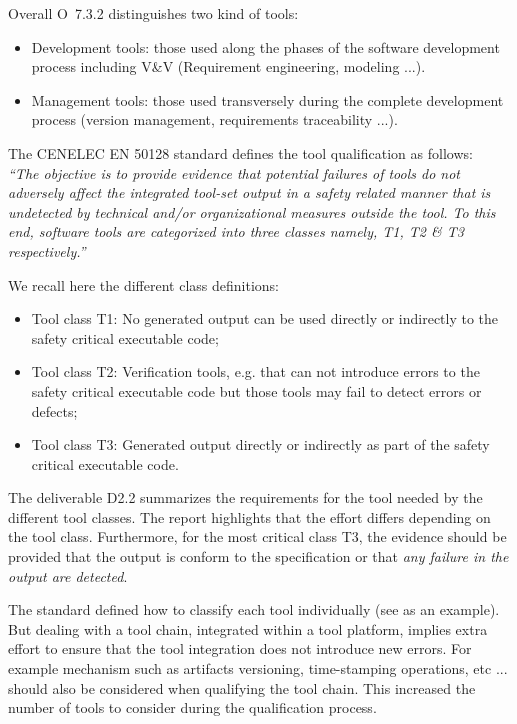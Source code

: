 \documentclass{template/openetcs_report}
\begin{document}
Overall O~7.3.2 distinguishes two kind of tools:
\begin{itemize}
\item Development tools: those used along the phases of the software development process including V\&V  (Requirement engineering, modeling ...).
\item Management tools: those used transversely during the complete development process (version
management, requirements traceability ...).
\end{itemize}

The CENELEC EN 50128 standard \cite{standard_railway_2011} defines the tool
qualification as follows:\\
{\it ``The objective is to provide evidence that potential
failures of tools do not adversely affect the integrated tool-set output in a
safety related manner that is undetected by technical and/or organizational
measures outside the tool. To this end, software tools are categorized into
three classes namely, T1, T2 \& T3 respectively.''}

We recall here the different class definitions:
\begin{itemize}
\item Tool class T1: No generated output can be used directly or indirectly to the
  safety critical executable code;
\item Tool class T2: Verification tools, e.g. that can not introduce
  errors to the safety critical executable code but those tools may fail to detect errors or
  defects;
\item Tool class T3: Generated output directly or indirectly  as part of the
  safety critical executable code.
\end{itemize}
The deliverable D2.2 \cite{pokam_report_2013} summarizes the requirements for the
tool needed by the different tool classes. The report highlights that the
effort differs depending on the tool class. Furthermore, for
the most critical class T3,  the evidence should be provided that the output is
conform to the specification or that \emph{any failure in the output
  are detected}. 

The standard defined how to classify each tool individually (see
\cite{nielsen_efficient_2012,huang_test_2013} as an example).  But dealing with a tool
chain, integrated within a tool platform, implies extra effort to
ensure that the tool integration does not introduce new errors. For
example mechanism such as artifacts versioning, time-stamping
operations, etc ... should also be considered when qualifying the tool
chain. This increased the number of tools to consider during the
qualification process.
\end{document}
